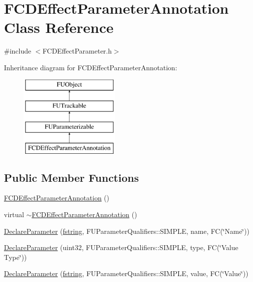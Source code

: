 \hypertarget{classFCDEffectParameterAnnotation}{
\section{FCDEffectParameterAnnotation Class Reference}
\label{classFCDEffectParameterAnnotation}
}


{\ttfamily \#include $<$FCDEffectParameter.h$>$}

Inheritance diagram for FCDEffectParameterAnnotation:\begin{figure}[H]
\begin{center}
\leavevmode
\includegraphics[height=4.000000cm]{classFCDEffectParameterAnnotation}
\end{center}
\end{figure}
\subsection*{Public Member Functions}
\begin{DoxyCompactItemize}
\item 
\hyperlink{classFCDEffectParameterAnnotation_a5b1857a81202e62800f3c1bcac6627fa}{FCDEffectParameterAnnotation} ()
\item 
virtual \hyperlink{classFCDEffectParameterAnnotation_a9eea09226dcd4ca7446bfc9b14302029}{$\sim$FCDEffectParameterAnnotation} ()
\item 
\hyperlink{classFCDEffectParameterAnnotation_a74a444cbb66d179737de9295fd49687d}{DeclareParameter} (\hyperlink{classfm_1_1stringT}{fstring}, FUParameterQualifiers::SIMPLE, name, FC(\char`\"{}Name\char`\"{}))
\item 
\hyperlink{classFCDEffectParameterAnnotation_afd3d8cdacd96378545bbef52335e23da}{DeclareParameter} (uint32, FUParameterQualifiers::SIMPLE, type, FC(\char`\"{}Value Type\char`\"{}))
\item 
\hyperlink{classFCDEffectParameterAnnotation_a88ba3b71a44d7b9be365acb8036cfeaf}{DeclareParameter} (\hyperlink{classfm_1_1stringT}{fstring}, FUParameterQualifiers::SIMPLE, value, FC(\char`\"{}Value\char`\"{}))
\end{DoxyCompactItemize}


